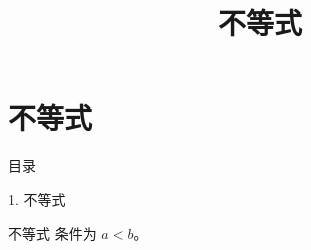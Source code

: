 \documentclass[aspectratio=169,10pt,fontset=fandol]{ctexbeamer}
\title{不等式}
\begin{document}
\section{不等式}
\begin{frame}[t,fragile]{目录}
\normalsize
{\color{blue}\normalsize 1. 不等式\par}\vspace{0.3em}
\end{frame}
\begin{frame}[t,fragile]{不等式}
\normalsize
{\normalsize
条件为 $a<b$。
}
\end{frame}
\end{document}
